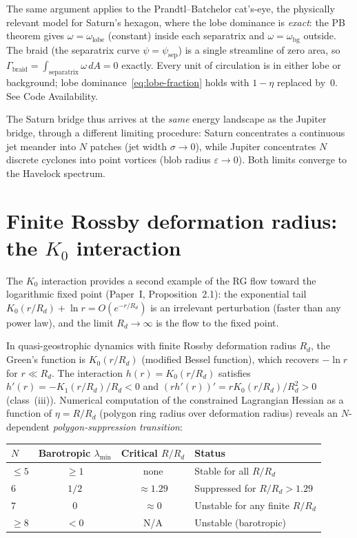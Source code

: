 \begin{remark}
The same argument applies to the Prandtl--Batchelor
cat's-eye, the physically relevant model for Saturn's
hexagon, where the lobe dominance is \emph{exact}:
the PB theorem \citep{Batchelor1956} gives
$\omega = \omega_{\mathrm{lobe}}$ (constant) inside each
separatrix and $\omega = \omega_{\mathrm{bg}}$ outside.
The braid (the separatrix curve $\psi = \psi_{\mathrm{sep}}$)
is a single streamline of zero area, so
$\Gamma_{\mathrm{braid}}
= \int_{\mathrm{separatrix}}\!\omega\,dA = 0$ exactly.
Every unit of circulation is in either lobe or background;
lobe dominance~\eqref{eq:lobe-fraction} holds with
$1{-}\eta$ replaced by~$0$.
See Code Availability.
\end{remark}

The Saturn bridge thus arrives at the \emph{same} energy landscape as
the Jupiter bridge, through a different limiting procedure: Saturn
concentrates a continuous jet meander into $N$ patches (jet width
$\sigma \to 0$), while Jupiter concentrates $N$ discrete cyclones
into point vortices (blob radius $\varepsilon \to 0$).
Both limits converge to the Havelock spectrum.

\section{Finite Rossby deformation radius: the $K_0$ interaction}
\label{sec:deformation}

The $K_0$ interaction provides a second example of the RG flow
toward the logarithmic fixed point
(Paper~I, Proposition~2.1): the exponential tail
$K_0(r/R_d) + \ln r = O(e^{-r/R_d})$ is an irrelevant perturbation
(faster than any power law), and the limit $R_d \to \infty$ is the
flow to the fixed point.

In quasi-geostrophic dynamics with finite Rossby deformation radius
$R_d$, the Green's function is $K_0(r/R_d)$ (modified Bessel function),
which recovers $-\ln r$ for $r \ll R_d$.  The interaction $h(r) =
K_0(r/R_d)$ satisfies $h'(r) = -K_1(r/R_d)/R_d < 0$ and
$(rh'(r))' = rK_0(r/R_d)/R_d^2 > 0$ (class~(iii)).  Numerical
computation of the constrained Lagrangian Hessian as a function of
$\eta = R/R_d$ (polygon ring radius over deformation radius) reveals
an $N$-dependent \emph{polygon-suppression transition}:

\begin{center}
\begin{tabular}{lccl}
\toprule
$N$ & Barotropic $\lambda_{\min}$ & Critical $R/R_d$ & Status \\
\midrule
$\le 5$ & $\ge 1$ & none & Stable for all $R/R_d$ \\
$6$ & $1/2$ & $\approx 1.29$ & Suppressed for $R/R_d > 1.29$ \\
$7$ & $0$ & $\approx 0$ & Unstable for any finite $R/R_d$ \\
$\ge 8$ & $< 0$ & N/A & Unstable (barotropic) \\
\bottomrule
\end{tabular}
\end{center}

